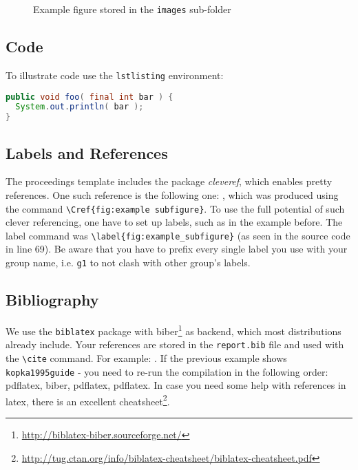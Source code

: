 \begin{figure}[tb]
\centering
    \qquad
\caption{Example figure stored in the \texttt{images} sub-folder}
\label{fig:example subfigure}
\end{figure}


\subsection*{Code}
To illustrate code use the \texttt{lstlisting} environment:
\begin{lstlisting}[language=Java]
public void foo( final int bar ) {
  System.out.println( bar );
}
\end{lstlisting}


\subsection*{Labels and References}
The proceedings template includes the package \textit{cleveref}, which enables pretty references. One such reference is the following one: , which was produced using the command \verb|\Cref{fig:example subfigure}|.
To use the full potential of such clever referencing, one have to set up labels, such as in the example before. The label command was \verb|\label{fig:example_subfigure}| (as seen in the source code in line 69).
Be aware that you have to prefix every single label you use with your group name, i.e. \verb|g1| to not clash with other group's labels.

\subsection*{Bibliography}
We use the \verb|biblatex| package with biber\footnote{\url{http://biblatex-biber.sourceforge.net/}} as backend, which most distributions already include.
Your references are stored in the \texttt{report.bib} file and used with the \texttt{\textbackslash cite} command. 
For example: \cite{kopka1995guide}. 
If the previous example shows \verb|kopka1995guide| - you need to re-run the compilation in the following order: pdflatex, biber, pdflatex, pdflatex.
In case you need some help with references in latex, there is an excellent cheatsheet\footnote{\url{http://tug.ctan.org/info/biblatex-cheatsheet/biblatex-cheatsheet.pdf}}.


\pagebreak